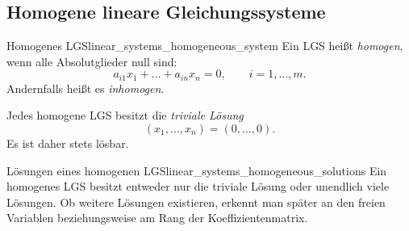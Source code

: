 \subsection{Homogene lineare Gleichungssysteme}
\label{subsec:linear_systems_homogeneous_systems}

\begin{DefinitionBox}{Homogenes LGS}{linear_systems_homogeneous_system}
  Ein LGS heißt \emph{homogen}, wenn alle Absolutglieder null sind:
  \[
    a_{i1}x_1+\dots+a_{in}x_n=0,
    \qquad i=1,\dots,m.
  \]
  Andernfalls heißt es \emph{inhomogen}.
\end{DefinitionBox}

Jedes homogene LGS besitzt die \emph{triviale Lösung}
\[
  (x_1,\dots,x_n)=(0,\dots,0).
\]
Es ist daher stets lösbar.

\begin{KeyPointBox}{Lösungen eines homogenen LGS}{linear_systems_homogeneous_solutions}
  Ein homogenes LGS besitzt entweder nur die triviale Lösung oder unendlich
  viele Lösungen. Ob weitere Lösungen existieren, erkennt man später an den
  freien Variablen beziehungsweise am Rang der Koeffizientenmatrix.
\end{KeyPointBox}
